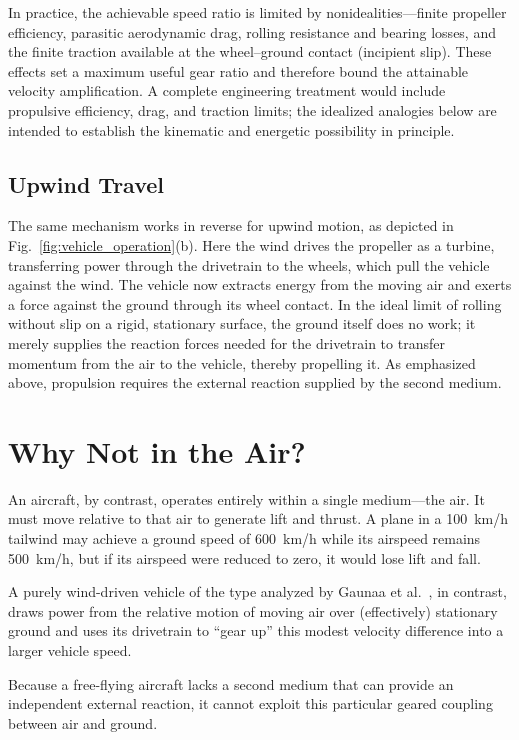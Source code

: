 \documentclass[a4paper]{article}
\begin{document}
In practice, the achievable speed ratio is limited by nonidealities---finite propeller efficiency, parasitic aerodynamic drag, rolling resistance and bearing losses, and the finite traction available at the wheel--ground contact (incipient slip). These effects set a maximum useful gear ratio and therefore bound the attainable velocity amplification. A complete engineering treatment would include propulsive efficiency, drag, and traction limits; the idealized analogies below are intended to establish the kinematic and energetic possibility in principle.

\subsection{Upwind Travel}

The same mechanism works in reverse for upwind motion, as depicted in Fig.~\ref{fig:vehicle_operation}(b). Here the wind drives the propeller as a turbine, transferring power through the drivetrain to the wheels, which pull the vehicle against the wind.
The vehicle now extracts energy from the moving air and exerts a force against the ground through its wheel contact. In the ideal limit of rolling without slip on a rigid, stationary surface, the ground itself does no work; it merely supplies the reaction forces needed for the drivetrain to transfer momentum from the air to the vehicle, thereby propelling it.
As emphasized above, propulsion requires the external reaction supplied by the second medium.

\section{Why Not in the Air?}
\label{wind:whynotintheair}

An aircraft, by contrast, operates entirely within a single medium---the air. It must move relative to that air to generate lift and thrust.
A plane in a \SI{100}{km/h} tailwind may achieve a ground speed of \SI{600}{km/h} while its airspeed remains \SI{500}{km/h}, but if its airspeed were reduced to zero, it would lose lift and fall.

A purely wind-driven vehicle of the type analyzed by Gaunaa et al.~\cite{Gaunaa2009}, in contrast, draws power from the relative motion of moving air over (effectively) stationary ground and uses its drivetrain to ``gear up'' this modest velocity difference into a larger vehicle speed.

Because a free-flying aircraft lacks a second medium that can provide an
independent external reaction, it cannot exploit this particular geared
coupling between air and ground.
\end{document}
